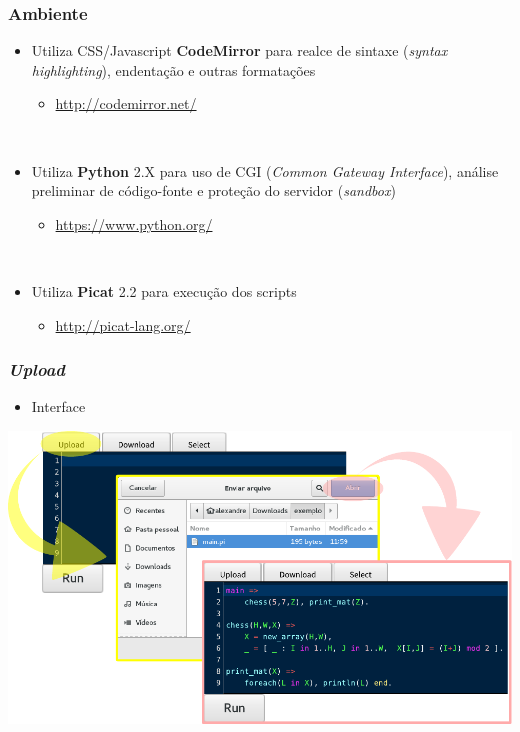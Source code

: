 \documentclass[brazil]{beamer}
\begin{document}
\begin{frame}

    \frametitle{Ambiente}

    \begin{itemize}
      \item Utiliza CSS/Javascript \textbf{CodeMirror} para realce de sintaxe (\textit{syntax highlighting}), endentação e outras formatações
      \begin{itemize}
        \item \url{http://codemirror.net/}
      \end{itemize} ~\\

      \item Utiliza \textbf{Python} 2.X para uso de CGI (\textit{Common Gateway Interface}), análise preliminar de código-fonte e proteção do servidor (\textit{sandbox})
      \begin{itemize}
        \item \url{https://www.python.org/}
      \end{itemize} ~\\

      \item Utiliza \textbf{Picat} 2.2 para execução dos scripts
      \begin{itemize}
        \item \url{http://picat-lang.org/}
      \end{itemize}

    \end{itemize}
\end{frame}


\begin{frame}

    \frametitle{\textit{Upload}}

    \begin{itemize}
      \item Interface
    \end{itemize}

\begin{center}
\includegraphics[width=.8\textwidth]{figures/func-upload.pdf}
\end{center}

\end{frame}
\end{document}
